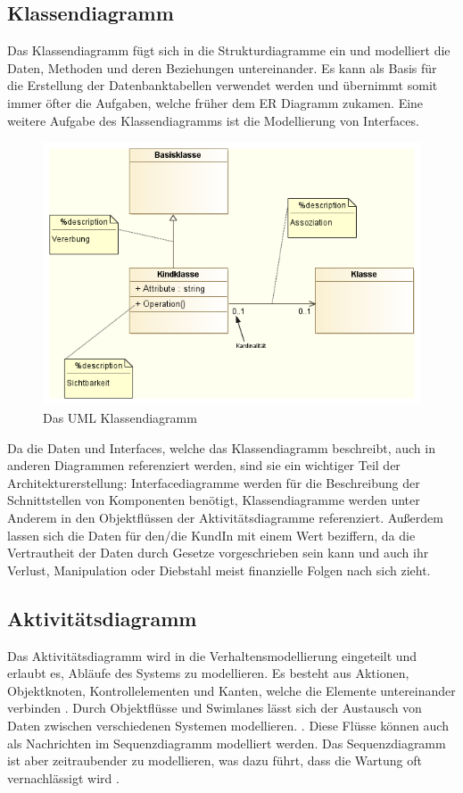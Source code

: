 \subsection{Klassendiagramm}
Das Klassendiagramm fügt sich in die Strukturdiagramme ein und modelliert die Daten, Methoden und deren Beziehungen untereinander. Es kann als Basis für die Erstellung der Datenbanktabellen verwendet werden und übernimmt somit immer öfter die Aufgaben, welche früher dem ER Diagramm zukamen. Eine weitere Aufgabe des Klassendiagramms ist die Modellierung von Interfaces. \cite[S. 108-110]{glasklar}

\begin{figure}[H]
    \centering
    \includegraphics[scale=0.8]{uml/modelling/class.png}
    \caption{Das UML Klassendiagramm}
    \label{fig:umlclassmodel}
\end{figure}


Da die Daten und Interfaces, welche das Klassendiagramm beschreibt, auch in anderen Diagrammen referenziert werden, sind sie ein wichtiger Teil der Architekturerstellung: Interfacediagramme werden für die Beschreibung der Schnittstellen von Komponenten benötigt, Klassendiagramme werden unter Anderem in den Objektflüssen der Aktivitätsdiagramme referenziert. Außerdem lassen sich die Daten für den/die KundIn mit einem Wert beziffern, da die Vertrautheit der Daten durch Gesetze vorgeschrieben sein kann und auch ihr Verlust, Manipulation oder Diebstahl meist finanzielle Folgen nach sich zieht.


\subsection{Aktivitätsdiagramm}
Das Aktivitätsdiagramm wird in die Verhaltensmodellierung eingeteilt und erlaubt es, Abläufe des Systems zu modellieren. Es besteht aus Aktionen, Objektknoten, Kontrollelementen und Kanten, welche die Elemente untereinander verbinden \cite[S. 264]{glasklar}. Durch Objektflüsse und Swimlanes lässt sich der Austausch von Daten zwischen verschiedenen Systemen modellieren. \cite[S. 268]{glasklar}. Diese Flüsse können auch als Nachrichten im Sequenzdiagramm modelliert werden. Das Sequenzdiagramm ist aber zeitraubender zu modellieren, was dazu führt, dass die Wartung oft vernachlässigt wird \cite[S. 414]{glasklar}. \cite[S. 263-274]{glasklar}


